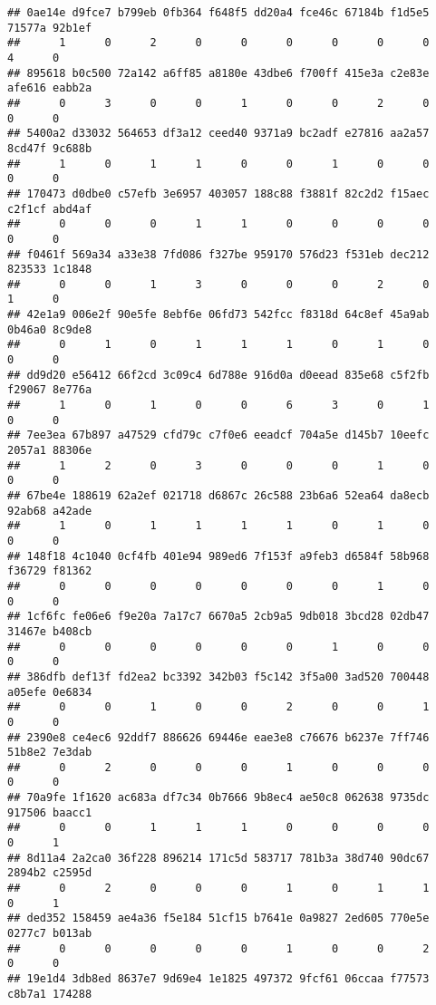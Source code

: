 \documentclass[
]{article}
\begin{document}
\begin{verbatim}
## 0ae14e d9fce7 b799eb 0fb364 f648f5 dd20a4 fce46c 67184b f1d5e5 71577a 92b1ef 
##      1      0      2      0      0      0      0      0      0      4      0 
## 895618 b0c500 72a142 a6ff85 a8180e 43dbe6 f700ff 415e3a c2e83e afe616 eabb2a 
##      0      3      0      0      1      0      0      2      0      0      0 
## 5400a2 d33032 564653 df3a12 ceed40 9371a9 bc2adf e27816 aa2a57 8cd47f 9c688b 
##      1      0      1      1      0      0      1      0      0      0      0 
## 170473 d0dbe0 c57efb 3e6957 403057 188c88 f3881f 82c2d2 f15aec c2f1cf abd4af 
##      0      0      0      1      1      0      0      0      0      0      0 
## f0461f 569a34 a33e38 7fd086 f327be 959170 576d23 f531eb dec212 823533 1c1848 
##      0      0      1      3      0      0      0      2      0      1      0 
## 42e1a9 006e2f 90e5fe 8ebf6e 06fd73 542fcc f8318d 64c8ef 45a9ab 0b46a0 8c9de8 
##      0      1      0      1      1      1      0      1      0      0      0 
## dd9d20 e56412 66f2cd 3c09c4 6d788e 916d0a d0eead 835e68 c5f2fb f29067 8e776a 
##      1      0      1      0      0      6      3      0      1      0      0 
## 7ee3ea 67b897 a47529 cfd79c c7f0e6 eeadcf 704a5e d145b7 10eefc 2057a1 88306e 
##      1      2      0      3      0      0      0      1      0      0      0 
## 67be4e 188619 62a2ef 021718 d6867c 26c588 23b6a6 52ea64 da8ecb 92ab68 a42ade 
##      1      0      1      1      1      1      0      1      0      0      0 
## 148f18 4c1040 0cf4fb 401e94 989ed6 7f153f a9feb3 d6584f 58b968 f36729 f81362 
##      0      0      0      0      0      0      0      1      0      0      0 
## 1cf6fc fe06e6 f9e20a 7a17c7 6670a5 2cb9a5 9db018 3bcd28 02db47 31467e b408cb 
##      0      0      0      0      0      0      1      0      0      0      0 
## 386dfb def13f fd2ea2 bc3392 342b03 f5c142 3f5a00 3ad520 700448 a05efe 0e6834 
##      0      0      1      0      0      2      0      0      1      0      0 
## 2390e8 ce4ec6 92ddf7 886626 69446e eae3e8 c76676 b6237e 7ff746 51b8e2 7e3dab 
##      0      2      0      0      0      1      0      0      0      0      0 
## 70a9fe 1f1620 ac683a df7c34 0b7666 9b8ec4 ae50c8 062638 9735dc 917506 baacc1 
##      0      0      1      1      1      0      0      0      0      0      1 
## 8d11a4 2a2ca0 36f228 896214 171c5d 583717 781b3a 38d740 90dc67 2894b2 c2595d 
##      0      2      0      0      0      1      0      1      1      0      1 
## ded352 158459 ae4a36 f5e184 51cf15 b7641e 0a9827 2ed605 770e5e 0277c7 b013ab 
##      0      0      0      0      0      1      0      0      2      0      0 
## 19e1d4 3db8ed 8637e7 9d69e4 1e1825 497372 9fcf61 06ccaa f77573 c8b7a1 174288 

\end{verbatim}
\end{document}
